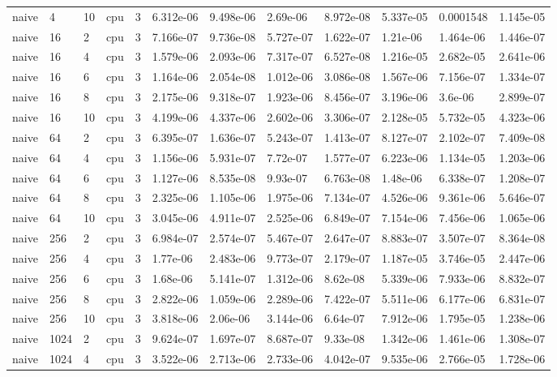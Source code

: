 \begin{tabular}{llllllllllll}
naive & 4 & 10 & cpu & 3 & 6.312e-06 & 9.498e-06 & 2.69e-06 & 8.972e-08 & 5.337e-05 & 0.0001548 & 1.145e-05 \\
naive & 16 & 2 & cpu & 3 & 7.166e-07 & 9.736e-08 & 5.727e-07 & 1.622e-07 & 1.21e-06 & 1.464e-06 & 1.446e-07 \\
naive & 16 & 4 & cpu & 3 & 1.579e-06 & 2.093e-06 & 7.317e-07 & 6.527e-08 & 1.216e-05 & 2.682e-05 & 2.641e-06 \\
naive & 16 & 6 & cpu & 3 & 1.164e-06 & 2.054e-08 & 1.012e-06 & 3.086e-08 & 1.567e-06 & 7.156e-07 & 1.334e-07 \\
naive & 16 & 8 & cpu & 3 & 2.175e-06 & 9.318e-07 & 1.923e-06 & 8.456e-07 & 3.196e-06 & 3.6e-06 & 2.899e-07 \\
naive & 16 & 10 & cpu & 3 & 4.199e-06 & 4.337e-06 & 2.602e-06 & 3.306e-07 & 2.128e-05 & 5.732e-05 & 4.323e-06 \\
naive & 64 & 2 & cpu & 3 & 6.395e-07 & 1.636e-07 & 5.243e-07 & 1.413e-07 & 8.127e-07 & 2.102e-07 & 7.409e-08 \\
naive & 64 & 4 & cpu & 3 & 1.156e-06 & 5.931e-07 & 7.72e-07 & 1.577e-07 & 6.223e-06 & 1.134e-05 & 1.203e-06 \\
naive & 64 & 6 & cpu & 3 & 1.127e-06 & 8.535e-08 & 9.93e-07 & 6.763e-08 & 1.48e-06 & 6.338e-07 & 1.208e-07 \\
naive & 64 & 8 & cpu & 3 & 2.325e-06 & 1.105e-06 & 1.975e-06 & 7.134e-07 & 4.526e-06 & 9.361e-06 & 5.646e-07 \\
naive & 64 & 10 & cpu & 3 & 3.045e-06 & 4.911e-07 & 2.525e-06 & 6.849e-07 & 7.154e-06 & 7.456e-06 & 1.065e-06 \\
naive & 256 & 2 & cpu & 3 & 6.984e-07 & 2.574e-07 & 5.467e-07 & 2.647e-07 & 8.883e-07 & 3.507e-07 & 8.364e-08 \\
naive & 256 & 4 & cpu & 3 & 1.77e-06 & 2.483e-06 & 9.773e-07 & 2.179e-07 & 1.187e-05 & 3.746e-05 & 2.447e-06 \\
naive & 256 & 6 & cpu & 3 & 1.68e-06 & 5.141e-07 & 1.312e-06 & 8.62e-08 & 5.339e-06 & 7.933e-06 & 8.832e-07 \\
naive & 256 & 8 & cpu & 3 & 2.822e-06 & 1.059e-06 & 2.289e-06 & 7.422e-07 & 5.511e-06 & 6.177e-06 & 6.831e-07 \\
naive & 256 & 10 & cpu & 3 & 3.818e-06 & 2.06e-06 & 3.144e-06 & 6.64e-07 & 7.912e-06 & 1.795e-05 & 1.238e-06 \\
naive & 1024 & 2 & cpu & 3 & 9.624e-07 & 1.697e-07 & 8.687e-07 & 9.33e-08 & 1.342e-06 & 1.461e-06 & 1.308e-07 \\
naive & 1024 & 4 & cpu & 3 & 3.522e-06 & 2.713e-06 & 2.733e-06 & 4.042e-07 & 9.535e-06 & 2.766e-05 & 1.728e-06 \\

\end{tabular}
